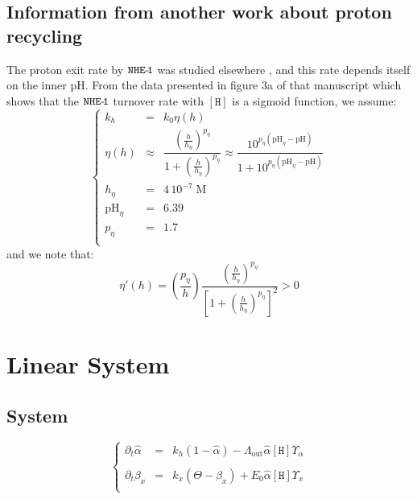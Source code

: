 \documentclass[aps,onecolumn,11pt]{revtex4}
\newcommand{\mychem}[1]{\mathtt{#1}}
\newcommand{\myconc}[1]{\left\lbrack{#1}\right\rbrack}
\newcommand{\spproton}{\mychem{H}}
\newcommand{\proton}{\myconc{\spproton}}
\newcommand{\LiAll}{\Lambda}
\newcommand{\LiAllOut}{{\LiAll}_{\mathrm{out}}}
\newcommand{\NHE}[1]{\mychem{NHE}{\mychem{\hbox{-}\!#1}}}
\newcommand{\todo}[1]{\framebox{\textbf{\color{WildStrawberry}{#1}}}}
\begin{document}
\subsection{Information from another work about proton recycling}
The proton exit rate by $\NHE{1}$ was studied elsewhere \todo{ref EMBO Lacroix,Counillon}, and this rate depends itself on the inner pH.
From the data presented in figure 3a of that manuscript which shows that the $\NHE{1}$ turnover rate with $\proton$ is a sigmoid function, we
assume:
\begin{equation}
\label{eq:kh}
\left\lbrace
\begin{array}{rcl}
k_h & = & k_0 \eta(h)\\
\eta(h) & \approx & \dfrac{\left(\frac{h}{h_\eta}\right)^{p_\eta}}{1+\left(\frac{h}{h_\eta}\right)^{p_\eta}} \approx 
        \dfrac
{
10^{p_\eta(\mathrm{pH}_\eta-\mathrm{pH})}
}
{
1+10^{p_\eta(\mathrm{pH}_\eta-\mathrm{pH})}
}\\
h_\eta & = & 4\,10^{-7} \; \text{M}\\
\mathrm{pH}_\eta & = & 6.39 \\
p_\eta & = & 1.7 \\
\end{array}
\right.
\end{equation}
and we note that:
\begin{equation}
	\eta'(h) = \left(\dfrac{p_\eta}{h}\right) \dfrac{\left(\frac{h}{h_\eta}\right)^{p_\eta}}{\left[1+\left(\frac{h}{h_\eta}\right)^{p_\eta}\right]^2}  > 0
\end{equation}

\section{Linear System}
\subsection{System}
\begin{equation}
\label{eq:syslin}
\left\lbrace
\begin{array}{rcl}
\partial_t \hat\alpha & = &
	 k_h \left(1-\hat\alpha\right) 
	 - \LiAllOut    \hat\alpha\proton \Upsilon_\alpha  \\
	 \\
	\partial_t \beta_x & = & k_x\left(\Theta - \beta_x\right) +E_0  \hat\alpha  \proton \Upsilon_x \\
\end{array}
\right.
\end{equation}
\end{document}
